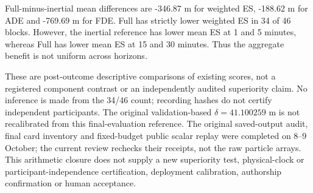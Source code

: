 Full-minus-inertial mean differences are -346.87 m for weighted ES, -188.62 m for ADE and -769.69 m for FDE. Full has strictly lower weighted ES in 34 of 46 blocks. However, the inertial reference has lower mean ES at 1 and 5 minutes, whereas Full has lower mean ES at 15 and 30 minutes. Thus the aggregate benefit is not uniform across horizons.

These are post-outcome descriptive comparisons of existing scores, not a registered component contrast or an independently audited superiority claim. No inference is made from the 34/46 count; recording hashes do not certify independent participants. The original validation-based $\delta=41.100259$ m is not recalibrated from this final-evaluation reference. The original saved-output audit, final card inventory and fixed-budget public scalar replay were completed on 8--9 October; the current review rechecks their receipts, not the raw particle arrays. This arithmetic closure does not supply a new superiority test, physical-clock or participant-independence certification, deployment calibration, authorship confirmation or human acceptance.
\FloatBarrier
